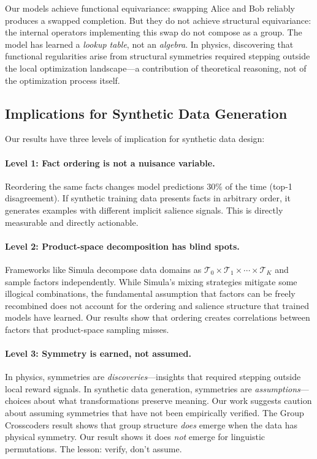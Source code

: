 \documentclass[10pt, letterpaper]{article}
\begin{document}
Our models achieve functional equivariance: swapping Alice and Bob reliably produces a swapped completion. But they do not achieve structural equivariance: the internal operators implementing this swap do not compose as a group. The model has learned a \emph{lookup table}, not an \emph{algebra}. In physics, discovering that functional regularities arise from structural symmetries required stepping outside the local optimization landscape---a contribution of theoretical reasoning, not of the optimization process itself.

\subsection{Implications for Synthetic Data Generation}

Our results have three levels of implication for synthetic data design:

\paragraph{Level 1: Fact ordering is not a nuisance variable.} Reordering the same facts changes model predictions 30\% of the time (top-1 disagreement). If synthetic training data presents facts in arbitrary order, it generates examples with different implicit salience signals. This is directly measurable and directly actionable.

\paragraph{Level 2: Product-space decomposition has blind spots.} Frameworks like Simula \cite{davidson2026simula} decompose data domains as $\mathcal{T}_0 \times \mathcal{T}_1 \times \cdots \times \mathcal{T}_K$ and sample factors independently. While Simula's mixing strategies mitigate some illogical combinations, the fundamental assumption that factors can be freely recombined does not account for the ordering and salience structure that trained models have learned. Our results show that ordering creates correlations between factors that product-space sampling misses.

\paragraph{Level 3: Symmetry is earned, not assumed.} In physics, symmetries are \emph{discoveries}---insights that required stepping outside local reward signals. In synthetic data generation, symmetries are \emph{assumptions}---choices about what transformations preserve meaning. Our work suggests caution about assuming symmetries that have not been empirically verified. The Group Crosscoders result shows that group structure \emph{does} emerge when the data has physical symmetry. Our result shows it does \emph{not} emerge for linguistic permutations. The lesson: verify, don't assume.
\end{document}
